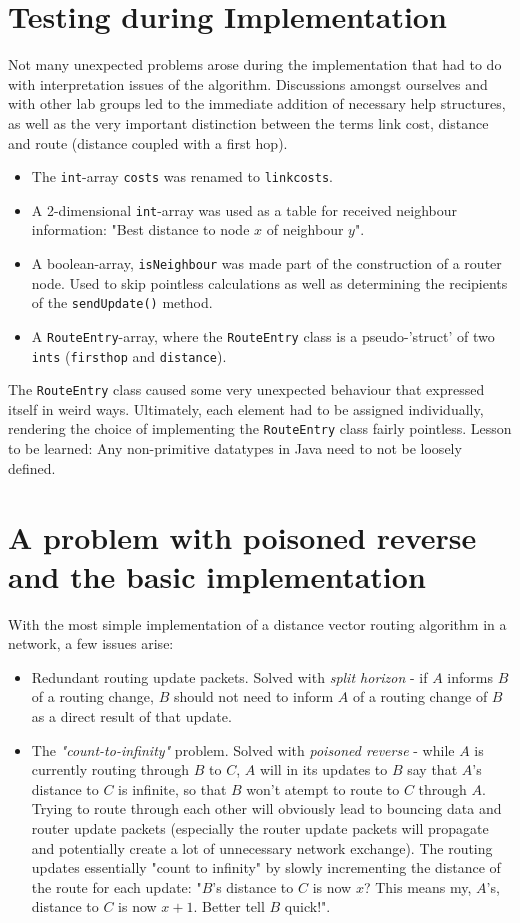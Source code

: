 \documentclass[10pt,a4paper]{article}
\begin{document}
\section{Testing during Implementation}
Not many unexpected problems arose during the implementation that had to do with interpretation issues of the algorithm. Discussions amongst ourselves and with other lab groups led to the immediate addition of necessary help structures, as well as the very important distinction between the terms link cost, distance and route (distance coupled with a first hop).
\begin{itemize}
\item The \verb=int=-array \verb=costs= was renamed to \verb=linkcosts=.
\item  A 2-dimensional \verb=int=-array was used as a table for received neighbour information: "Best distance to node $x$ of neighbour $y$".
\item  A boolean-array, \verb=isNeighbour= was made part of the construction of a router node. Used to skip pointless calculations as well as determining the recipients of the \verb=sendUpdate()= method.
\item  A \verb=RouteEntry=-array, where the \verb=RouteEntry= class is a pseudo-'struct' of two \verb=ints= (\verb=firsthop= and \verb=distance=).
\end{itemize}

The \verb=RouteEntry= class caused some very unexpected behaviour that expressed itself in weird ways. Ultimately, each element had to be assigned individually, rendering the choice of implementing the \verb=RouteEntry= class fairly pointless. Lesson to be learned: Any non-primitive datatypes in Java need to not be loosely defined.


\section{A problem with poisoned reverse and the basic implementation}
With the most simple implementation of a distance vector routing algorithm in a network, a few issues arise:
\begin{itemize}
  \item Redundant routing update packets. Solved with \emph{split horizon}\cite{tcpip} - if $A$ informs $B$ of a routing change, $B$ should not need to inform $A$ of a routing change of $B$ as a direct result of that update.
  \item  The \emph{"count-to-infinity"} problem. Solved with \emph{poisoned reverse} - while $A$ is currently routing through $B$ to $C$, $A$ will in its updates to $B$ say that $A$'s distance to $C$ is infinite, so that $B$ won't atempt to route to $C$ through $A$. Trying to route through each other will obviously lead to bouncing data and router update packets (especially the router update packets will propagate and potentially create a lot of unnecessary network exchange). The routing updates essentially "count to infinity" by slowly incrementing the distance of the route for each update: "$B$'s distance to $C$ is now $x$? This means my, $A$'s, distance to $C$ is now $x+1$. Better tell $B$ quick!".
\end{itemize}
\end{document}
